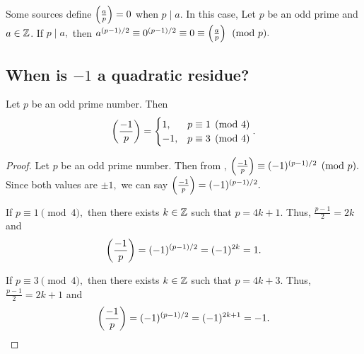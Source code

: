 \documentclass{ximera}
\begin{document}
\begin{remark}
	Some sources define $\left(\frac{a}{p}\right)=0$ when $p\mid a.$ In this case,  Let $p$ be an odd prime and $a\in\mathbb Z$.
	If $p\mid a,$ then $a^{(p-1)/2}\equiv 0^{(p-1)/2}\equiv 0\equiv\left(\frac{a}{p}\right)\pmod{p}.$
\end{remark}

\subsection{When is $-1$ a quadratic residue?}

\begin{theorem}[Theorem 4.6]\label{thm:residue-neg1}
	Let $p$ be an odd prime number. Then 
	\[
		\left(\frac{-1}{p}\right)=
			\begin{cases}
 				1, & p\equiv 1\pmod{4}\\
				-1, & p\equiv 3\pmod{4}
			\end{cases}.
	\]
\end{theorem}

\begin{proof}
	Let $p$ be an odd prime number. Then from , $\left(\frac{-1}{p}\right)\equiv (-1)^{(p-1)/2}\pmod{p}.$ Since both values are $\pm1,$ we can say $\left(\frac{-1}{p}\right)=(-1)^{(p-1)/2}.$

	If $p\equiv 1\pmod{4},$ then there exists $k\in\mathbb Z$ such that $p=4k+1.$ Thus, $\frac{p-1}{2}=2k$ and 
		\[
			\left(\frac{-1}{p}\right)=(-1)^{(p-1)/2}=(-1)^{2k}=1.
		\]
	
	If $p\equiv 3\pmod{4},$ then there exists $k\in\mathbb Z$ such that $p=4k+3.$ Thus, $\frac{p-1}{2}=2k+1$ and 
		\[
			\left(\frac{-1}{p}\right)=(-1)^{(p-1)/2}=(-1)^{2k+1}=-1.
		\]
\end{proof}
\end{document}
